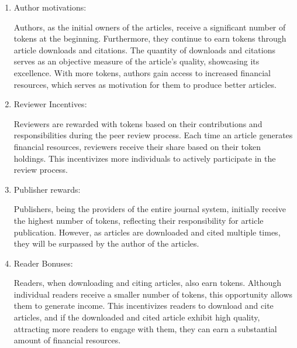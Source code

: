 \documentclass[lettersize,journal]{IEEEtran}
\begin{document}
\begin{enumerate}
  \item Author motivations:

  Authors, as the initial owners of the articles, receive a significant number of tokens at the beginning. Furthermore, they continue to earn tokens through article downloads and citations. The quantity of downloads and citations serves as an objective measure of the article's quality, showcasing its excellence. With more tokens, authors gain access to increased financial resources, which serves as motivation for them to produce better articles.

  \item Reviewer Incentives:
  
  Reviewers are rewarded with tokens based on their contributions and responsibilities during the peer review process. Each time an article generates financial resources, reviewers receive their share based on their token holdings. This incentivizes more individuals to actively participate in the review process.
  
  \item Publisher rewards:
  
  Publishers, being the providers of the entire journal system, initially receive the highest number of tokens, reflecting their responsibility for article publication. However, as articles are downloaded and cited multiple times, they will be surpassed by the author of the articles.

  \item Reader Bonuses:

  Readers, when downloading and citing articles, also earn tokens. Although individual readers receive a smaller number of tokens, this opportunity allows them to generate income. This incentivizes readers to download and cite articles, and if the downloaded and cited article exhibit high quality, attracting more readers to engage with them, they can earn a substantial amount of financial resources.

\end{enumerate}

\end{document}
